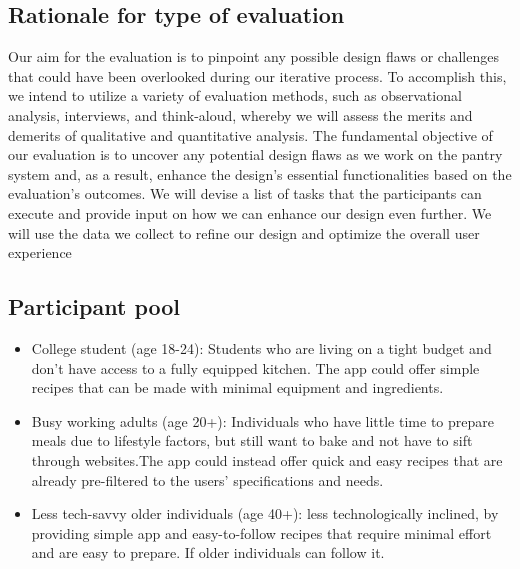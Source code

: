 \documentclass[manuscript, screen, nonacm]{acmart}
\begin{document}
\subsection{Rationale for type of evaluation}
Our aim for the evaluation is to pinpoint any possible design flaws or challenges that could have been overlooked during our iterative process. To accomplish this, we intend to utilize a variety of evaluation methods, such as observational analysis, interviews, and think-aloud, whereby we will assess the merits and demerits of qualitative and quantitative analysis. 
The fundamental objective of our evaluation is to uncover any potential design flaws as we work on the pantry system and, as a result, enhance the design's essential functionalities based on the evaluation's outcomes. We will devise a list of tasks that the participants can execute and provide input on how we can enhance our design even further. We will use the data we collect to refine our design and optimize the overall user experience

\subsection{Participant pool}
\begin{itemize}
    \item College student (age 18-24): Students who are living on a tight budget and don't have access to a fully equipped kitchen. The app could offer simple recipes that can be made with minimal equipment and ingredients.
    \item Busy working adults (age 20+): Individuals who have little time to prepare meals due to lifestyle factors, but still want to bake and not have to sift through websites.The app could instead offer quick and easy recipes that are already pre-filtered to the users' specifications and needs.
    \item Less tech-savvy older individuals (age 40+): less technologically inclined, by providing simple app and easy-to-follow recipes that require minimal effort and are easy to prepare. If older individuals can follow it.
\end{itemize}
\end{document}
